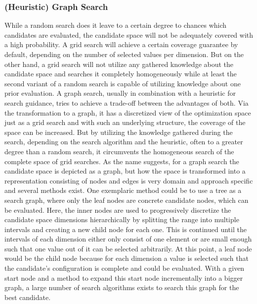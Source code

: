 \subsubsection{(Heuristic) Graph Search}
\label{sec:theory:optimization:graph}
While a random search does it leave to a certain degree to chances which candidates are evaluated, the candidate space will not be adequately covered with a high probability.
A grid search will achieve a certain coverage guarantee by default, depending on the number of selected values per dimension.
But on the other hand, a grid search will not utilize any gathered knowledge about the candidate space and searches it completely homogeneously while at least the second variant of a random search is capable of utilizing knowledge about one prior evaluation.\newline
A graph search, usually in combination with a heuristic for search guidance, tries to achieve a trade-off between the advantages of both.
Via the transformation to a graph, it has a discretized view of the optimization space just as a grid search and with such an underlying structure, the coverage of the space can be increased.
But by utilizing the knowledge gathered during the search, depending on the search algorithm and the heuristic, often to a greater degree than a random search, it circumvents the homogeneous search of the complete space of grid searches.\newline
As the name suggests, for a graph search the candidate space is depicted as a graph, but how the space is transformed into a representation consisting of nodes and edges is very domain and approach specific and several methods exist.
One exemplaric method could be to use a tree as a search graph, where only the leaf nodes are concrete candidate nodes, which can be evaluated.
Here, the inner nodes are used to progressively discretize the candidate space dimensions hierarchically by splitting the range into multiple intervals and creating a new child node for each one.
This is continued until the intervals of each dimension either only consist of one element or are small enough such that one value out of it can be selected arbitrarily.
At this point, a leaf node would be the child node because for each dimension a value is selected such that the candidate's configuration is complete and could be evaluated.\newline
With a given start node and a method to expand this start node incrementally into a bigger graph, a large number of search algorithms exists to search this graph for the best candidate.
